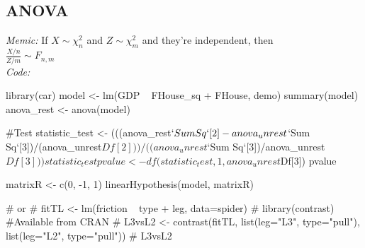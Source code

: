 \subsection{ANOVA}
\textit{Memic: } If $X \sim \chi_n^2$ and $Z \sim \chi_m^2$ and they're independent, then\\
$\frac{X/n}{Z/m} \sim F_{n,m}$\\
\textit{Code: }
\begin{spverbatim}
library(car)
model <- lm(GDP ~ FHouse_sq + FHouse, demo)
summary(model)
anova_rest <- anova(model)

#Test
statistic_test <- (((anova_rest$`Sum Sq`[2]-anova_unrest$`Sum Sq`[3])/(anova_unrest$Df[2]))
                   /((anova_unrest$`Sum Sq`[3])/anova_unrest$Df[3]))
statistic_test
pvalue <- df(statistic_test, 1, anova_unrest$Df[3])
pvalue

matrixR <- c(0, -1, 1)
linearHypothesis(model, matrixR)

# or 
# fitTL <- lm(friction ~ type + leg, data=spider)
# library(contrast) #Available from CRAN
# L3vsL2 <- contrast(fitTL, list(leg="L3", type="pull"), list(leg="L2", type="pull"))
# L3vsL2
\end{spverbatim}